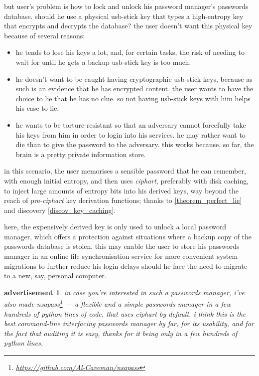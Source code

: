 \documentclass[twocolumn]{article}
\newtheorem{advertisement}{advertisement}
\begin{document}
but user's problem is how to lock and unlock his password manager's
passwords database.  should he use a physical usb-stick key that types a
high-entropy key that encrypts and decrypts the database?   the user
doesn't want this physical key because of several reasons:
\begin{itemize}
    \item he tends to lose his keys a lot, and, for certain tasks, the risk
    of needing to wait for until he gets a backup usb-stick key is too
    much.

    \item he doesn't want to be caught having cryptographic usb-stick keys,
    because as such is an evidence that he has encrypted content.  the user
    wants to have the choice to lie that he has no clue.  so not having
    usb-stick keys with him helps his case to lie.

    \item he wants to be torture-resistant so that an adversary cannot
    forcefully take his keys from him in order to login into his services.
    he may rather want to die than to give the password to the adversary.
    this works because, so far, the brain is a pretty private information
    store.
\end{itemize}

in this scenario, the user memorises a sensible password that he can
remember, with enough initial entropy, and then uses \emph{ciphart},
preferably with disk caching, to inject large amounts of entropy bits into
his derived keys, way beyond the reach of pre-\emph{ciphart} key derivation
functions; thanks to \cref{theorem_perfect_lie} and discovery
\ref{discov_key_caching}.  

here, the expensively derived key is only used to unlock a local password
manager, which offers a protection against situations where a backup copy
of the passwords database is stolen.  this may enable the user to store his
passwords manager in an online file synchronisation service for more
convenient system migrations to further reduce his login delays should he
face the need to migrate to a new, say, personal computer.

\begin{advertisement}
    in case you're interested in such a passwords manager, i've also made
    \emph{nsapass}\footnote{\url{https://github.com/Al-Caveman/nsapass}}
    --- a flexible and a simple passwords manager in a few hundreds of
    python lines of code, that uses \emph{ciphart} by default.  i think
    this is the best command-line interfacing passwords manager by far, for
    its usability, and for the fact that auditing it is easy, thanks for it
    being only in a few hundreds of python lines.
\end{advertisement}
\end{document}
